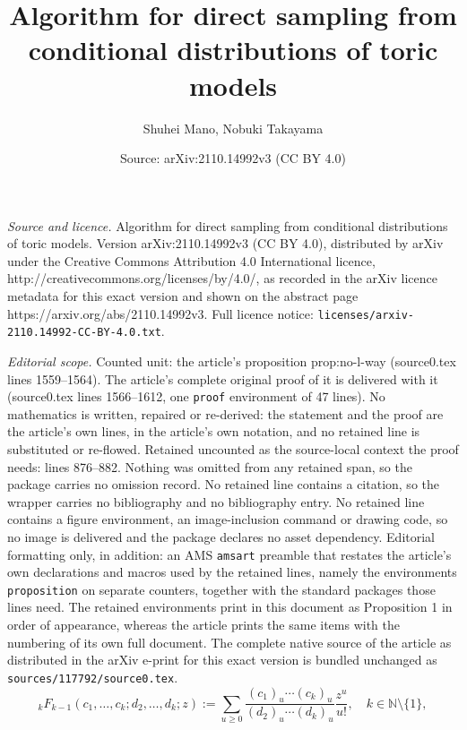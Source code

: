 \documentclass[10pt,a4paper]{amsart}
\title{Algorithm for direct sampling from conditional distributions of toric models}
\author{Shuhei Mano, Nobuki Takayama}
\date{Source: arXiv:2110.14992v3 (CC BY 4.0)}
\begin{document}
\maketitle

\noindent\emph{Source and licence.} Algorithm for direct sampling from conditional distributions of toric models. Version arXiv:2110.14992v3 (CC BY 4.0), distributed by arXiv under the Creative Commons Attribution 4.0 International licence, http://creativecommons.org/licenses/by/4.0/, as recorded in the arXiv licence metadata for this exact version and shown on the abstract page https://arxiv.org/abs/2110.14992v3. Full licence notice: \texttt{licenses/arxiv-2110.14992-CC-BY-4.0.txt}.\par\smallskip

\noindent\textit{Editorial scope.} Counted unit: the article's proposition prop:no-l-way (source0.tex lines 1559--1564). The article's complete original proof of it is delivered with it (source0.tex lines 1566--1612, one \texttt{proof} environment of 47 lines). No mathematics is written, repaired or re-derived: the statement and the proof are the article's own lines, in the article's own notation, and no retained line is substituted or re-flowed.  Retained uncounted as the source-local context the proof needs: lines 876--882.  Nothing was omitted from any retained span, so the package carries no omission record.  No retained line contains a citation, so the wrapper carries no bibliography and no bibliography entry.  No retained line contains a figure environment, an image-inclusion command or drawing code, so no image is delivered and the package declares no asset dependency.  Editorial formatting only, in addition: an AMS \texttt{amsart} preamble that restates the article's own declarations and macros used by the retained lines, namely the environments \texttt{proposition} on separate counters, together with the standard packages those lines need.  The retained environments print in this document as Proposition 1 in order of appearance, whereas the article prints the same items with the numbering of its own full document.  The complete native source of the article as distributed in the arXiv e-print for this exact version is bundled unchanged as \texttt{sources/117792/source0.tex}.
\begin{equation}
  {}_kF_{k-1}(c_1,\ldots,c_k;d_2,\ldots,d_k;z)
  :=\sum_{u\ge 0}\frac{(c_1)_u\cdots(c_k)_u}
  {(d_2)_u\cdots(d_k)_u}\frac{z^u}{u!}, \quad
  k\in\mathbb{N}\setminus\{1\},
  \label{chyp}
\end{equation}
\end{document}
